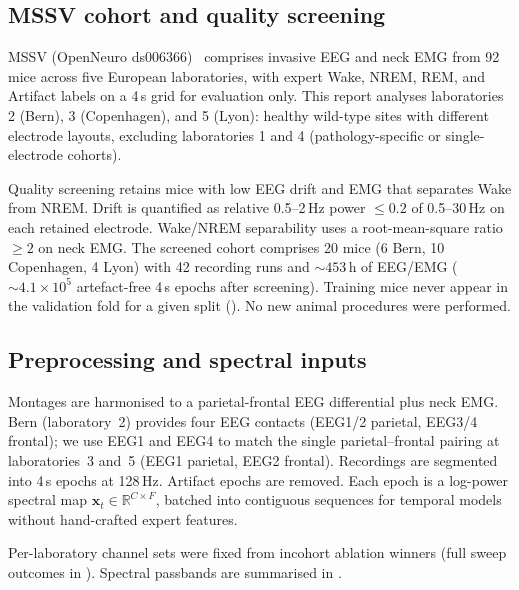 \subsection{MSSV cohort and quality screening}
\label{app:data:cohort}

MSSV (OpenNeuro ds006366)~\cite{rose2025mssv} comprises invasive EEG and neck EMG from 92 mice across five European laboratories, with expert Wake, NREM, REM, and Artifact labels on a 4\,s grid for evaluation only.
This report analyses laboratories 2 (Bern), 3 (Copenhagen), and 5 (Lyon): healthy wild-type sites with different electrode layouts, excluding laboratories 1 and 4 (pathology-specific or single-electrode cohorts).

Quality screening retains mice with low EEG drift and EMG that separates Wake from NREM.
Drift is quantified as relative 0.5--2\,Hz power $\leq 0.2$ of 0.5--30\,Hz on each retained electrode.
Wake/NREM separability uses a root-mean-square ratio $\geq 2$ on neck EMG.
The screened cohort comprises 20 mice (6 Bern, 10 Copenhagen, 4 Lyon) with 42 recording runs and ${\sim}453$\,h of EEG/EMG (${\sim}4.1 \times 10^{5}$ artefact-free 4\,s epochs after screening).
Training mice never appear in the validation fold for a given split ().
No new animal procedures were performed.

\label{app:tab:cohort}
\apptabular{\small}

\subsection{Preprocessing and spectral inputs}
\label{app:data:preprocessing}

Montages are harmonised to a parietal-frontal EEG differential plus neck EMG.
Bern (laboratory~2) provides four EEG contacts (EEG1/2 parietal, EEG3/4 frontal); we use EEG1 and EEG4 to match the single parietal--frontal pairing at laboratories~3 and~5 (EEG1 parietal, EEG2 frontal).
Recordings are segmented into 4\,s epochs at 128\,Hz. Artifact epochs are removed.
Each epoch is a log-power spectral map $\mathbf{x}_t \in \mathbb{R}^{C \times F}$, batched into contiguous sequences for temporal models without hand-crafted expert features.

Per-laboratory channel sets were fixed from incohort ablation winners (full sweep outcomes in ).
Spectral passbands are summarised in .

